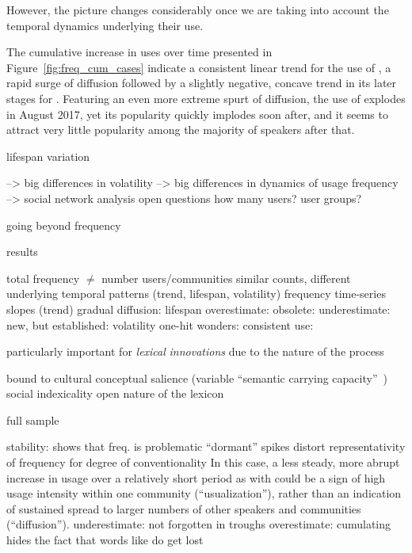 \documentclass[
  a4paper,
  abstract=on,
  captions=tableabove
  ]{scrartcl}
\begin{document}
        However, the picture changes considerably once we are taking into account the temporal dynamics underlying their use.

         The cumulative increase in uses over time presented in Figure~\ref{fig:freq_cum_cases} indicate a consistent linear trend for the use of , a rapid surge of diffusion followed by a slightly negative, concave trend in its later stages for . Featuring an even more extreme spurt of diffusion, the use of  explodes in August 2017, yet its popularity quickly implodes soon after, and it seems to attract very little popularity among the majority of speakers after that.

        lifespan
        variation



      --> big differences in volatility
      --> big differences in dynamics of usage frequency
      --> social network analysis
        open questions
          how many
          users?
          user groups?




going beyond frequency

  results

    total frequency $\neq$ number users/communities
      similar counts, different underlying temporal patterns (trend, lifespan, volatility)
    frequency time-series
      slopes (trend)
        gradual diffusion: 
      lifespan
        overestimate: obsolete: 
        underestimate: new, but established: 
      volatility
        one-hit wonders: 
        consistent use: 

  particularly important for \emph{lexical} \emph{innovations} due to the nature of the process

    bound to cultural conceptual salience (variable \enquote{semantic carrying capacity}~\parencite{Nini2017ApplicationGrowth})
    social indexicality
    open nature of the lexicon




  full sample

  stability: shows that freq. is problematic
    \enquote{dormant}
    spikes distort representativity of frequency for degree of conventionality
      In this case, a less steady, more abrupt increase in usage over a relatively short period as with  could be a sign of high usage intensity within one community (\enquote{usualization}), rather than an indication of sustained spread to larger numbers of other speakers and communities (\enquote{diffusion}).
    underestimate:  not forgotten in troughs
    overestimate: cumulating hides the fact that words like  do get lost
\end{document}
